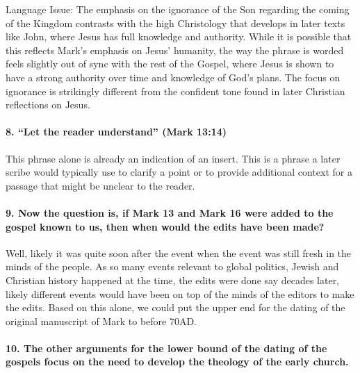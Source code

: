 Language Issue: The emphasis on the ignorance of the Son regarding the coming of the Kingdom contrasts with the high Christology that develops in later texts like John, where Jesus has full knowledge and authority.
While it is possible that this reflects Mark's emphasis on Jesus' humanity, the way the phrase is worded feels slightly out of sync with the rest of the Gospel, where Jesus is shown to have a strong authority over time and knowledge of God's plans.
The focus on ignorance is strikingly different from the confident tone found in later Christian reflections on Jesus.

\paragraph{8.
``Let the reader understand'' (Mark 13:14)}\label{par:let-the-reader-understand-mark-1314}

This phrase alone is already an indication of an insert.
This is a phrase a later scribe would typically use to clarify a point or to provide additional context for a passage that might be unclear to the reader.

\paragraph{9.
Now the question is, if Mark 13 and Mark 16 were added to the gospel known to us, then when would the edits have been made?}\label{par:now-the-question-is-if-mark-13-and-mark-16-were-added-to-the-gospel-known-to-us-then-when-would-the-edits-have-been-made}

Well, likely it was quite soon after the event when the event was still fresh in the minds of the people.
As so many events relevant to global politics, Jewish and Christian history happened at the time, the edits were done say decades later, likely different events would have been on top of the minds of the editors to make the edits.
Based on this alone, we could put the upper end for the dating of the original manuscript of Mark to before 70AD.

\paragraph{10.
The other arguments for the lower bound of the dating of the gospels focus on the need to develop the theology of the early church.}\label{par:the-other-arguments-for-the-lower-bound-of-the-dating-of-the-gospels-focus-on-the-need-to-develop-the-theology-of-the-early-church.}

